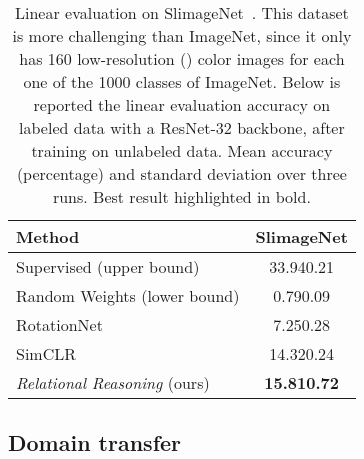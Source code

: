 \documentclass{article}
\begin{document}
\begin{table}[H]
 \caption{Linear evaluation on SlimageNet~\citep{antoniou2020defining}. This dataset is more challenging than ImageNet, since it only has 160 low-resolution () color images for each one of the 1000 classes of ImageNet. Below is reported the linear evaluation accuracy on labeled data with a ResNet-32 backbone, after training on unlabeled data. Mean accuracy (percentage) and standard deviation over three runs. Best result highlighted in bold.}
 \label{tab:linear_evaluation_slim}
 \begin{adjustbox}{width=0.40\columnwidth,center}
  \centering
  \begin{tabular}{lc}
    \toprule
    \textbf{Method} & \textbf{SlimageNet} \\
    \midrule
    Supervised (upper bound) & 33.94\small{0.21} \\
    Random Weights (lower bound) & 0.79\small{0.09} \\
    \midrule
    RotationNet \citep{gidaris2018unsupervised} & 7.25\small{0.28} \\
    SimCLR \citep{chen2020simple} & 14.32\small{0.24} \\
    \emph{Relational Reasoning} (ours)  & \textbf{15.81\small{0.72}} \\
    \bottomrule
  \end{tabular}
 \end{adjustbox}
\end{table}

\subsection{Domain transfer}\label{appendix:additional_domain_transfer}
\end{document}
